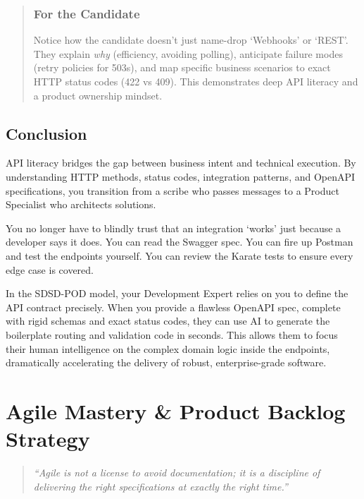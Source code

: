 \begin{quote}
\subsection{For the Candidate}\label{for-the-candidate-1}

Notice how the candidate doesn't just name-drop `Webhooks' or `REST'.
They explain \emph{why} (efficiency, avoiding polling), anticipate
failure modes (retry policies for 503s), and map specific business
scenarios to exact HTTP status codes (422 vs 409). This demonstrates
deep API literacy and a product ownership mindset.
\end{quote}

\section{Conclusion}\label{conclusion-3}

API literacy bridges the gap between business intent and technical
execution. By understanding HTTP methods, status codes, integration
patterns, and OpenAPI specifications, you transition from a scribe who
passes messages to a Product Specialist who architects solutions.

You no longer have to blindly trust that an integration `works' just
because a developer says it does. You can read the Swagger spec. You can
fire up Postman and test the endpoints yourself. You can review the
Karate tests to ensure every edge case is covered.

In the SDSD-POD model, your Development Expert relies on you to define
the API contract precisely. When you provide a flawless OpenAPI spec,
complete with rigid schemas and exact status codes, they can use AI to
generate the boilerplate routing and validation code in seconds. This
allows them to focus their human intelligence on the complex domain
logic inside the endpoints, dramatically accelerating the delivery of
robust, enterprise-grade software.

\chapter{Agile Mastery \& Product Backlog
Strategy}\label{agile-mastery-product-backlog-strategy}

\begin{quote}
\emph{``Agile is not a license to avoid documentation; it is a
discipline of delivering the right specifications at exactly the right
time.''}
\end{quote}


